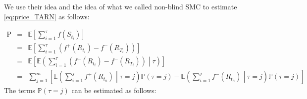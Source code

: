 \documentclass{article}
\begin{document}
We use their idea and the idea of what we called non-blind SMC to estimate \eqref{eq:price_TARN} as follows:

\begin{eqnarray} 
\text{P} & = & \mathbb{E} \left [ \sum_{i=1}^{\tau} f(S_{t_{i}}) \right ]  \nonumber \\
& = &  \mathbb{E} \left [ \sum_{i=1}^{\tau} \left ( f^{+}(R_{t_{i}}) - f^{-} (R_{T_{i}}) \right ) \right ] \nonumber \\
& = & \mathbb{E} \left [ \mathbb{E} \left (\sum_{i=1}^{\tau} \left ( f^{+}(R_{t_{i}}) - f^{-} (R_{T_{i}}) \right ) \middle| \tau \right ) \right ]  \nonumber \\
& = & \sum_{j=1}^{m} \left [ \mathbb{E} \left ( \sum_{i=1}^{j} f^{+}(R_{t_{n}}) \middle| \tau = j \right ) \mathbb{P} (\tau = j) - \mathbb{E} \left ( \sum_{i=1}^{j} f^{-}(R_{t_{n}}) \middle| \tau = j \right ) \mathbb{P} (\tau = j) \right ] \label{eq:price_TARN_idea}
\end{eqnarray}
The terms $\mathbb{P} (\tau = j)$ can be estimated as follows:
\end{document}
